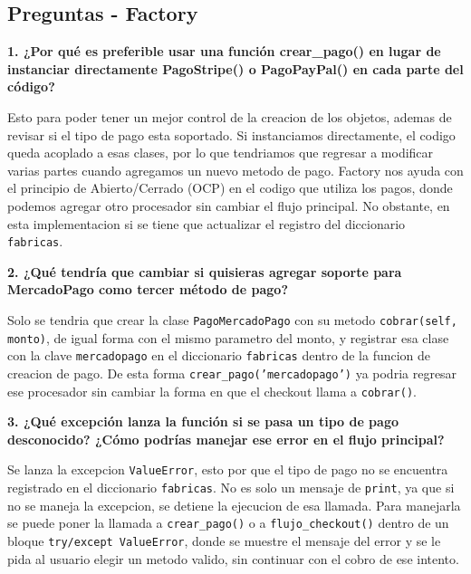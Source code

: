 \documentclass[letterpaper,11pt]{article}
\begin{document}
\subsection*{Preguntas - Factory}

\textbf{1. ¿Por qué es preferible usar una función crear\_pago() en lugar de instanciar directamente PagoStripe() o PagoPayPal() en cada parte del código?}

Esto para poder tener un mejor control de la creacion de los objetos, ademas de revisar si el tipo de pago esta soportado. Si instanciamos directamente, el codigo queda acoplado a esas clases, por lo que tendriamos que regresar a modificar varias partes cuando agregamos un nuevo metodo de pago. Factory nos ayuda con el principio de Abierto/Cerrado (OCP) en el codigo que utiliza los pagos, donde podemos agregar otro procesador sin cambiar el flujo principal. No obstante, en esta implementacion si se tiene que actualizar el registro del diccionario \texttt{fabricas}.

\textbf{2. ¿Qué tendría que cambiar si quisieras agregar soporte para MercadoPago como tercer método de pago?}

Solo se tendria que crear la clase \texttt{PagoMercadoPago} con su metodo \texttt{cobrar(self, monto)}, de igual forma con el mismo parametro del monto, y registrar esa clase con la clave \texttt{mercadopago} en el diccionario \texttt{fabricas} dentro de la funcion de creacion de pago. De esta forma \texttt{crear\_pago('mercadopago')} ya podria regresar ese procesador sin cambiar la forma en que el checkout llama a \texttt{cobrar()}.

\textbf{3. ¿Qué excepción lanza la función si se pasa un tipo de pago desconocido? ¿Cómo podrías manejar ese error en el flujo principal?}

Se lanza la excepcion \texttt{ValueError}, esto por que el tipo de pago no se encuentra registrado en el diccionario \texttt{fabricas}. No es solo un mensaje de \texttt{print}, ya que si no se maneja la excepcion, se detiene la ejecucion de esa llamada. Para manejarla se puede poner la llamada a \texttt{crear\_pago()} o a \texttt{flujo\_checkout()} dentro de un bloque \texttt{try/except ValueError}, donde se muestre el mensaje del error y se le pida al usuario elegir un metodo valido, sin continuar con el cobro de ese intento.
\end{document}

